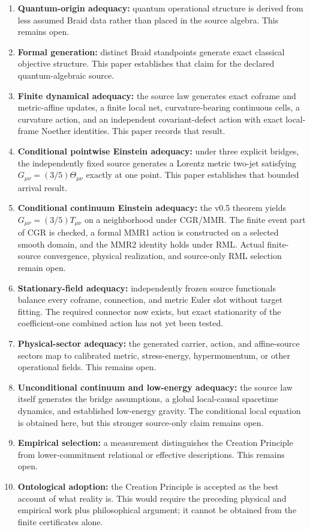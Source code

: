 \documentclass[11pt]{article}
\theoremstyle{definition}
\theoremstyle{remark}
\begin{document}
\begin{enumerate}
\item \textbf{Quantum-origin adequacy:} quantum operational structure is derived from less assumed Braid data rather than placed in the source algebra. This remains open.
\item \textbf{Formal generation:} distinct Braid standpoints generate exact classical objective structure. This paper establishes that claim for the declared quantum-algebraic source.
\item \textbf{Finite dynamical adequacy:} the source law generates exact coframe and metric-affine updates, a finite local net, curvature-bearing continuous cells, a curvature action, and an independent covariant-defect action with exact local-frame Noether identities. This paper records that result.
\item \textbf{Conditional pointwise Einstein adequacy:} under three explicit bridges, the independently fixed source generates a Lorentz metric two-jet satisfying $G_{\mu\nu}=(3/5)\Theta_{\mu\nu}$ exactly at one point. This paper establishes that bounded arrival result.
\item \textbf{Conditional continuum Einstein adequacy:} the v0.5 theorem yields $G_{\mu\nu}=(3/5)T_{\mu\nu}$ on a neighborhood under CGR/MMR. The finite event part of CGR is checked, a formal MMR1 action is constructed on a selected smooth domain, and the MMR2 identity holds under RML. Actual finite-source convergence, physical realization, and source-only RML selection remain open.
\item \textbf{Stationary-field adequacy:} independently frozen source functionals balance every coframe, connection, and metric Euler slot without target fitting. The required connector now exists, but exact stationarity of the coefficient-one combined action has not yet been tested.
\item \textbf{Physical-sector adequacy:} the generated carrier, action, and affine-source sectors map to calibrated metric, stress-energy, hypermomentum, or other operational fields. This remains open.
\item \textbf{Unconditional continuum and low-energy adequacy:} the source law itself generates the bridge assumptions, a global local-causal spacetime dynamics, and established low-energy gravity. The conditional local equation is obtained here, but this stronger source-only claim remains open.
\item \textbf{Empirical selection:} a measurement distinguishes the Creation Principle from lower-commitment relational or effective descriptions. This remains open.
\item \textbf{Ontological adoption:} the Creation Principle is accepted as the best account of what reality is. This would require the preceding physical and empirical work plus philosophical argument; it cannot be obtained from the finite certificates alone.
\end{enumerate}
\end{document}

